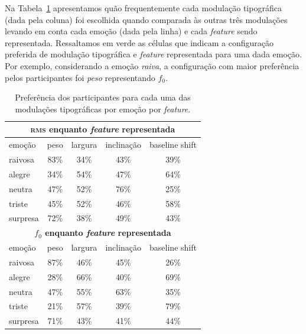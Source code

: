 \documentclass[11pt]{article}
\begin{document}
  Na Tabela~\ref{tab:type_perf} apresentamos quão frequentemente cada modulação tipográfica (dada pela coluna) foi escolhida quando comparada às outras três modulações levando em conta cada emoção (dada pela linha) e cada {\itshape feature} sendo representada. Ressaltamos em verde as células que indicam a configuração preferida de modulação tipográfica e {\itshape feature} representada para uma dada emoção. Por exemplo, considerando a emoção {\itshape raiva}, a configuração com maior preferência pelos participantes foi {\itshape peso} representando $f_0$.
  
\begin{table}
    \begin{tabular*}{\linewidth}{lcccc}
        \toprule
        \multicolumn{5}{c}{ \textbf{\textsc{rms} enquanto {\itshape feature} representada} }     \\
        \midrule
        emoção & peso & largura & inclinação & baseline shift  \\
        \midrule
        raivosa       & 83\% & 34\% & 43\% & 39\% \\
        alegre        & 34\% & 54\% & 47\% & 64\% \\
        neutra        & 47\% & 52\% & \cellcolor[HTML]{9ef7cd}76\% & 25\% \\
        triste        & 45\% & 52\% & 46\% & 58\% \\
        surpresa      & \cellcolor[HTML]{9ef7cd}72\% & 38\% & 49\% & 43\% \\
        \midrule
        \multicolumn{5}{c}{ \textbf{$f_0$ enquanto {\itshape feature} representada} }      \\
        \midrule
        emoção & peso & largura & inclinação & baseline shift  \\
        \midrule
        raivosa       & \cellcolor[HTML]{9ef7cd}87\% & 46\% & 45\% & 26\% \\
        alegre        & 28\% & 66\% & 40\% & \cellcolor[HTML]{9ef7cd}69\% \\
        neutra        & 47\% & 55\% & 63\% & 35\% \\
        triste        & 21\% & 57\% & 39\% & \cellcolor[HTML]{9ef7cd}79\% \\
        surpresa      & 71\% & 43\% & 41\% & 44\% \\
        \bottomrule
    \end{tabular*}
    \caption{Preferência dos participantes para cada uma das modulações tipográficas por emoção por {\itshape feature}. }
    \label{tab:type_perf}
\end{table}
  
\end{document}
